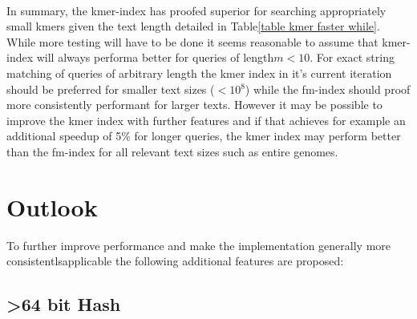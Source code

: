 ~

In summary, the kmer-index has proofed superior for searching appropriately
small kmers given the text length detailed in Table\ref{table kmer faster while}.
While more testing will have to be done it seems reasonable to assume
that kmer-index will always performa better for queries of length$m<10$.
For exact string matching of queries of arbitrary length the kmer
index in it's current iteration should be preferred for smaller text
sizes ($<10{{}^8}$) while the fm-index should proof more consistently
performant for larger texts. However it may be possible to improve
the kmer index with further features and if that achieves for example
an additional speedup of 5\% for longer queries, the kmer index may
perform better than the fm-index for all relevant text sizes such
as entire genomes.

\chapter{Outlook}

To further improve performance and make the implementation generally
more consistentlsapplicable the following additional features are
proposed:

\section{>64 bit Hash}

